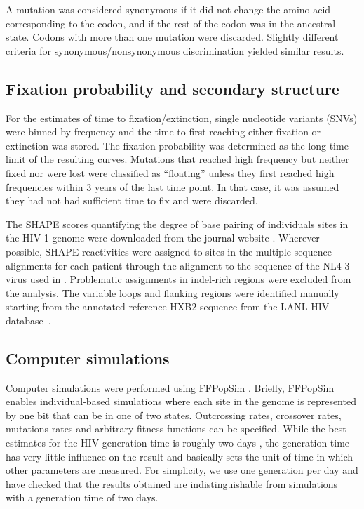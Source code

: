 \documentclass[11pt]{article}
\begin{document}
A mutation was considered synonymous if it did not change the amino acid
corresponding to the codon, and if the rest of the codon was in the ancestral
state. Codons with more than one mutation were discarded. Slightly different
criteria for synonymous/nonsynonymous discrimination yielded similar results.

\subsection*{Fixation probability and secondary structure}
For the estimates of time to fixation/extinction, single nucleotide variants
(SNVs) were binned by
frequency and the time to first reaching either fixation or extinction was
stored. The fixation probability was determined as the long-time limit of the
resulting curves. Mutations that reached high frequency but neither fixed nor
were lost were classified as ``floating'' unless they first
reached high frequencies within 3 years of the last time point. In that case, it was assumed
they had not had sufficient time to fix and were discarded.

The SHAPE scores quantifying the degree of base pairing of individuals sites in
the HIV-1 genome were downloaded from the journal website
\citep{watts_architecture_2009}. Wherever possible, SHAPE reactivities were
assigned to sites in the multiple sequence alignments for each patient through
the alignment to the sequence of the NL4-3 virus used in
\citep{watts_architecture_2009}. Problematic assignments in indel-rich
regions were excluded from the analysis. The variable loops and flanking
regions were identified manually starting from the annotated reference HXB2
sequence from the LANL HIV database~\citep{LANL2012}. 

\subsection*{Computer simulations}
Computer simulations were performed using FFPopSim
\citep{zanini_ffpopsim:_2012}. Briefly, FFPopSim enables individual-based
simulations where each site in the genome is represented by one bit that can be
in one of two states. Outcrossing rates, crossover rates, mutations rates and
arbitrary fitness functions can be specified. While the best estimates
for the HIV generation time is roughly two days
\citep{perelson_hiv-1_1996, markowitz_novel_2003}, the generation time
has very little influence on the result and basically sets the unit of
time in which other parameters are measured. For simplicity, we use one
generation per day and have checked that the results obtained are
indistinguishable from simulations with a generation time of two days.
\end{document}
